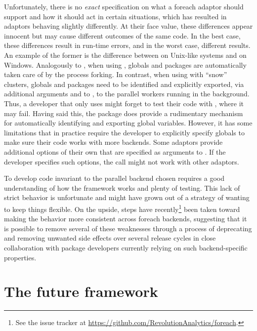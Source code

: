 Unfortunately, there is no \emph{exact} specification on what a
foreach adaptor should support and how it should act in certain
situations, which has resulted in adaptors behaving slightly
differently. At their face value, these differences appear innocent
but may cause different outcomes of the same code. In the best case,
these differences result in run-time errors, and in the worst case,
different results. An example of the former is the difference
between  on Unix-like systems and  on
Windows. Analogously to , when using ,
globals and packages are automatically taken care of by the process
forking. In contrast, when using  with ``snow''
clusters, globals and packages need to be identified and explicitly
exported, via additional arguments  and 
to , to the parallel workers running in the
background.  Thus, a developer that only uses  might forget
to test their code with , where it may fail.  Having
said this, the  package does provide a rudimentary
mechanism for automatically identifying and exporting global
variables.  However, it has some limitations that in practice require
the developer to explicitly specify globals to make sure their code
works with more backends.  Some adaptors provide additional options of
their own that are specified as arguments to . If the
developer specifies such options, the  call might not
work with other adaptors.

To develop  code invariant to the parallel backend
chosen requires a good understanding of how the 
framework works and plenty of testing. This lack of strict behavior is
unfortunate and might have grown out of a strategy of wanting to keep
things flexible. On the upside, steps have recently\footnote{See
the  issue tracker
at \url{https://github.com/RevolutionAnalytics/foreach}.}  been taken
toward making the behavior more consistent across foreach backends,
suggesting that it is possible to remove several of these weaknesses
through a process of deprecating and removing unwanted side effects
over several release cycles in close collaboration with package
developers currently relying on such backend-specific properties.


\section{The future framework}

